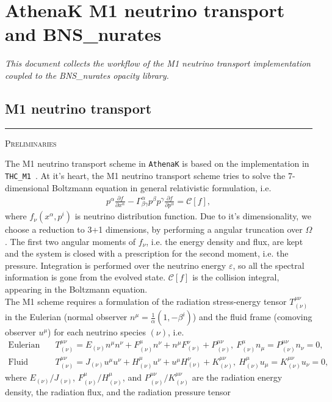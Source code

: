 \documentclass{article}
\newcommand{\step}[1]{%
  \par\medskip\noindent
  {\color{stepfg}\rule[-0.15ex]{2pt}{1.5ex}\hspace{0.5em}\scshape #1}%
  \hspace{0.75em}\ignorespaces}
\begin{document}
\section*{AthenaK M1 neutrino transport and BNS\_nurates}
\textit{This document collects the workflow of the M1 neutrino transport implementation
coupled to the BNS\_nurates opacity library.}

\subsection*{M1 neutrino transport}
\step{Preliminaries}
The M1 neutrino transport scheme in \texttt{AthenaK} is based on the implementation in \texttt{THC\_M1}~\cite{Radice:2021jtw}.
At it's heart, the M1 neutrino transport scheme tries to solve the 7-dimensional Boltzmann equation in general relativistic formulation, i.e.
\begin{align}
  p^{\alpha}\frac{\partial f}{\partial x^{\alpha}}-\Gamma_{\beta\gamma}^{\alpha}p^{\beta}p^{\gamma}\frac{\partial f}{\partial p^{\alpha}}=\mathcal{C}[f],
\end{align}
where $f_{\nu}(x^{\alpha},p^{i})$ is neutrino distribution function. Due to it's dimensionality, we choose a reduction to 3+1 dimensions, by performing a
angular truncation over $\Omega$. The first two angular moments of $f_{\nu}$, i.e. the energy density and flux, are kept and the system is closed with
a prescription for the second moment, i.e. the pressure. Integration is performed over the neutrino energy $\varepsilon$, so all the spectral information is gone from
the evolved state. $\mathcal{C}[f]$ is the collision integral, appearing in the Boltzmann equation.\\
The M1 scheme requires a formulation of the radiation stress-energy tensor $T^{\mu\nu}_{(\nu)}$ in the Eulerian (normal observer $n^{\mu}=\frac{1}{\alpha}(1,-\beta^i)$) and the fluid frame
(comoving observer $u^{\mu}$) for each neutrino species $(\nu)$, i.e.
\begin{align}
  \text{Eulerian frame:}&\quad T^{\mu\nu}_{(\nu)}=E_{(\nu)}n^{\mu}n^{\nu}+F_{(\nu)}^{\mu}n^{\nu}+n^{\mu}F_{(\nu)}^{\nu}+P_{(\nu)}^{\mu\nu},\ F_{(\nu)}^{\mu}n_{\mu}=P_{(\nu)}^{\mu\nu}n_{\nu}=0,\label{Equ:eulstress}\\
  \text{Fluid frame:}&\quad T^{\mu\nu}_{(\nu)}=J_{(\nu)}u^{\mu}u^{\nu}+H_{(\nu)}^{\mu}u^{\nu}+u^{\mu}H_{(\nu)}^{\nu}+K_{(\nu)}^{\mu\nu},\ H_{(\nu)}^{\mu}u_{\mu}=K_{(\nu)}^{\mu\nu}u_{\nu}=0,\label{Equ:fluidstress}
\end{align}
where $E_{(\nu)}/J_{(\nu)}$, $F_{(\nu)}^{\mu}/H_{(\nu)}^{\mu}$, and $P_{(\nu)}^{\mu\nu}/K_{(\nu)}^{\mu\nu}$ are the radiation energy density, the radiation flux, and the radiation pressure tensor
\end{document}
